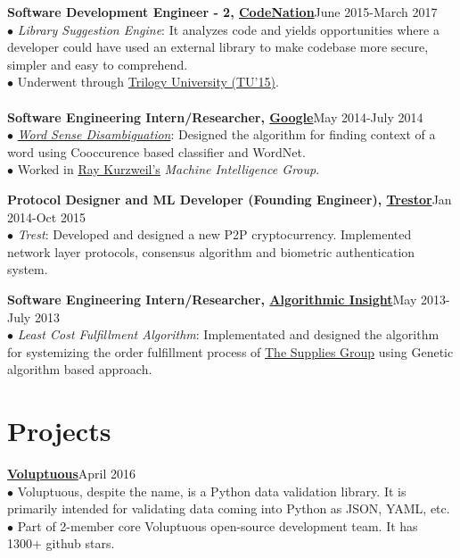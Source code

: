 \documentclass[margin,line]{resume}
\begin{document}
\begin{resume}
{\bf Software Development Engineer - 2, \href{http://codenation.co.in/}{CodeNation}}\hfill June 2015-March 2017\\
	$\bullet$ \emph{Library Suggestion Engine}: It analyzes code and yields opportunities where a developer could have used an external library to make codebase more secure, simpler and easy to comprehend.\\
      $\bullet$ Underwent through \href{https://hbr.org/2001/04/no-ordinary-boot-camp}{Trilogy University (TU'15)}.\\\\
      {\bf Software Engineering Intern/Researcher, \href{https://www.google.com/}{Google}}\hfill May 2014-July 2014\\
      $\bullet$ \href{https://en.wikipedia.org/wiki/Word-sense_disambiguation}{\emph{Word Sense Disambiguation}}: Designed the algorithm for finding context of a word using Cooccurence based classifier and WordNet.\\
      $\bullet$ Worked in \href{http://en.wikipedia.org/wiki/Ray_Kurzweil}{Ray Kurzweil's} \emph{Machine Intelligence Group}.

 {\bf Protocol Designer and ML Developer (Founding Engineer), \href{http://trestor.org/}{Trestor}}\hfill Jan 2014-Oct 2015\\
	$\bullet$ \emph{Trest}: Developed and designed a new P2P cryptocurrency. Implemented network layer protocols, consensus algorithm and biometric authentication system.

         {\bf Software Engineering Intern/Researcher, \href{http://tatrasdata.com/}{Algorithmic Insight}}\hfill May 2013-July 2013\\
      $\bullet$ \emph{Least Cost Fulfillment Algorithm}: Implementated and designed the algorithm for systemizing the order fulfillment process of \href{http://www.suppliesguys.com/}{The Supplies Group} using Genetic algorithm based approach.

\section{\mysidestyle \bf Projects}

 {\bf\href{https://github.com/alecthomas/voluptuous}{Voluptuous}}\hfill April 2016 \\
$\bullet$ Voluptuous, despite the name, is a Python data validation library. It is primarily intended for validating data coming into Python as JSON, YAML, etc. \\
$\bullet$ Part of 2-member core Voluptuous open-source development team. It has 1300+ github stars.


\end{resume}
\end{document}
